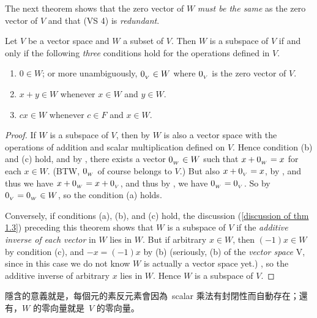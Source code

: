 The next theorem shows that the zero vector of \(W\) \emph{must be the same} as the zero vector of \(V\) and that (VS 4) is \emph{redundant}.

\begin{theorem} \label{thm 1.3}
Let \(V\) be a vector space and \(W\) a subset of \(V\).
Then \(W\) is a subspace of \(V\) if and only if the following \emph{three} conditions hold for the operations defined in \(V\).
\begin{enumerate}
    \item \(0 \in W\); or more unambiguously, \(0_{_V} \in W\) where \(0_{_V}\) is the zero vector of \(V\).
    \item \(x + y \in W\) whenever \(x \in W\) and \(y \in W\).
    \item \(cx \in W\) whenever \(c \in F\) and \(x \in W\).
\end{enumerate}
\end{theorem}

\begin{proof}
If \(W\) is a subspace of \(V\), then by  \(W\) is also a vector space with the operations of addition and scalar multiplication defined on \(V\).
Hence condition (b) and (c) hold, and by , there exists a vector \(0_{_W} \in W\)  such that \(x + 0_{_W} = x\) for each \(x \in W\).
(BTW, \(0_{_W}\) of course belongs to \(V\).)
But also \(x + 0_{_V} = x\), by , and thus we have \(x + 0_{_W} = x + 0_{_V}\), and thus by , we have \(0_{_W} = 0_{_V}\).
So by  \(0_{_V} = 0_{_W} \in W\), so the condition (a) holds.

Conversely, if conditions (a), (b), and (c) hold, the discussion  (\ref{discussion of thm 1.3}) preceding this theorem shows that \(W\) is a subspace of \(V\) if the \emph{additive inverse of each vector} in \(W\) lies in \(W\).
But if arbitrary \(x \in W\), then \((-1)x \in W\) by condition (c), and \(-x = (-1)x\) by (b)
(seriously, (b) of the \emph{vector space} V, since in this case we do not know \(W\) is actually a vector space yet.)
, so the additive inverse of arbitrary \(x\) lies in \(W\).
Hence \(W\) is a subspace of \(V\).
\end{proof}

\begin{note}
 隱含的意義就是，每個元的素反元素會因為\ scalar 乘法有封閉性而自動存在；還有，\(W\) 的零向量就是\ \(V\) 的零向量。
\end{note}

